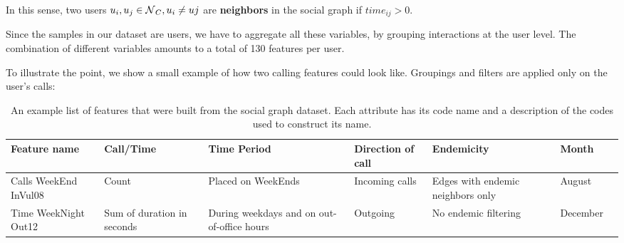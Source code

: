 In this sense, two users $u_i, u_j \in \operatorname{\mathcal{N}}_C, u_i \neq uj$ are \textbf{neighbors} in the social graph if $time_{ij} > 0$.



Since the samples in our dataset are users, we have to aggregate all these variables, by grouping interactions at the user level.
The combination of different variables amounts to a total of 130 features per user.

To illustrate the point, we show a small example of how two calling features could look like.
Groupings and filters are applied only on the user's calls:

\begin{table}[ht]
	\caption{An example list of features that were built from the social graph dataset.
Each attribute has its code name and a description of the codes used to construct its name.}\label{tab:data_example}
	\footnotesize
	\centering
	\begin{tabular} {|p{1.5cm}|p{1.5cm}|p{2cm}|p{1.5cm}|p{2cm}|p{1.5cm}|p{1cm}}
		\hline
		Feature name & Call/Time & Time Period & Direction of call & Endemicity & Month \\
		\hline
		Calls WeekEnd InVul08       & Count & Placed on WeekEnds & Incoming calls & Edges with endemic neighbors only & August\\
		\hline
		Time WeekNight Out12 & Sum of duration in seconds & During weekdays and on out-of-office hours & Outgoing   & No endemic filtering   & December \\
		\hline
	\end{tabular}
\end{table}


